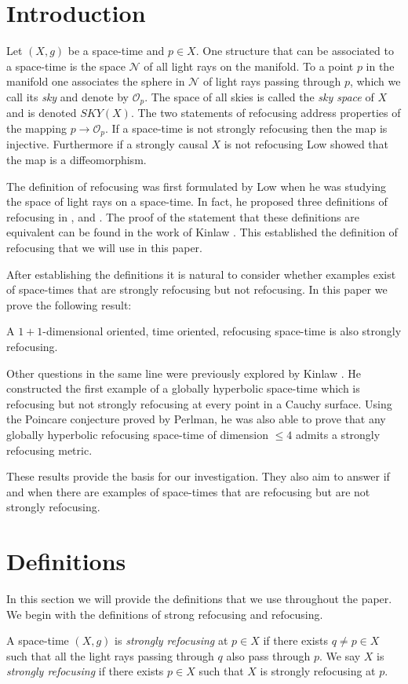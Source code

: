 \section{Introduction}
Let $(X,g)$ be a space-time and $p\in X$.  One structure that can be associated to a space-time is the space $\mathcal{N}$ of all light rays on the manifold.    To a point $p$ in the manifold one associates the sphere in $\mathcal{N}$ of light rays passing through $p$, which we call its \emph{sky} and denote by $\mathcal{O}_p$.  The space of all skies is called the \emph{sky space} of $X$ and is denoted $SKY(X)$.  The two statements of refocusing address  properties of the mapping $p\rightarrow \mathcal{O}_p$.  If a space-time is not strongly refocusing then the map is injective.  Furthermore if a strongly causal $X$ is not refocusing Low \cite{LowNull} showed that the map is a diffeomorphism.

The definition of refocusing was first formulated by Low when he was studying the space of light rays on a space-time.  In fact, he proposed three definitions of refocusing in \cite{LowCS}, \cite{LowSS} and \cite{LowNull}.  The proof of the statement that these definitions are equivalent can be found in the work of Kinlaw \cite{Kinlaw}.  This established the definition of refocusing that we will use in this paper.

After establishing the definitions it is natural to consider whether examples exist of space-times that are strongly refocusing but not refocusing.  In this paper we prove the following result:

\begin{prop} \label{mainProp}
A $1+1$-dimensional oriented, time oriented, refocusing space-time is also strongly refocusing.
\end{prop}

Other questions in the same line were previously explored by Kinlaw \cite{Kinlaw}.  He constructed the first example of a globally hyperbolic space-time which is refocusing but not strongly refocusing at every point in a Cauchy surface.  Using the Poincare conjecture proved by Perlman, he was also able to prove that any globally hyperbolic refocusing space-time of dimension $\leq 4$ admits a strongly refocusing metric.

These results provide the basis for our investigation.  They also aim to answer if and when there are examples of space-times that are refocusing but are not strongly refocusing.

\section{Definitions} 
In this section we will provide the definitions that we use throughout the paper.  We begin with the definitions of strong refocusing and refocusing.
\begin{defin} \label{srefoc}
A space-time $(X, g)$ is \emph{strongly refocusing} at $p\in X$ if there exists $q\neq p \in X$ such that all the light rays passing through $q$ also pass through $p$.  We say $X$ is \emph{strongly refocusing} if there exists $p\in X$ such that $X$ is strongly refocusing at $p$.
\end{defin}

